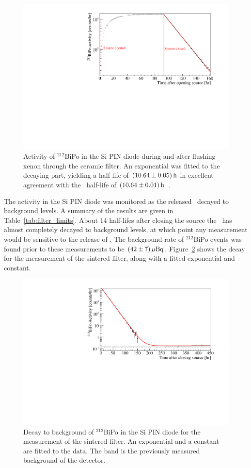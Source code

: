 \begin{figure}[htb]
\centering
\includegraphics[trim = 5 5 40 15, clip = true,width = 0.8\columnwidth]{figures/chapter_five/bipo_activity.pdf}
\caption{Activity of $^{212}$BiPo in the Si PIN diode during and after flushing xenon through the ceramic filter. An exponential was fitted to the decaying part, yielding a half-life of $(10.64\pm0.05)\, \mathrm{h}$ in excellent agreement with the \Pb~half-life of $(10.64\pm0.01)\, \mathrm{h}$~\cite{Firestone}.}
\label{fig:bipo}
\end{figure}

The activity in the Si PIN diode was monitored as the released \Pb~decayed to background levels. A summary of the results are given in Table~\ref{tab:filter_limits}. About 14 half-lifes after closing the source the \Pb~has almost completely decayed to background levels, at which point any measurement would be sensitive to the release of \Ra. The background rate of $^{212}$BiPo events was found prior to these measurements to be $(42\pm7)\, \mathrm{\mu Bq}$. Figure~\ref{fig:bipo_background} shows the decay for the measurement of the sintered filter, along with a fitted exponential and constant.

\begin{figure}[htb]
\centering
\includegraphics[trim = 10 5 40 15, clip = true,width = 0.8\columnwidth]{figures/chapter_five/bipo_background_sintered.pdf}
\caption{Decay to background of $^{212}$BiPo in the Si PIN diode for the measurement of the sintered filter. An exponential and a constant are fitted to the data. The band is the previously measured background of the detector.}
\label{fig:bipo_background}
\end{figure}

